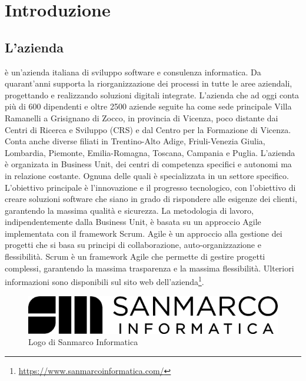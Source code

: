 \chapter{Introduzione}
\label{cap:introduzione}

%
%
%
%
%
%
%


\section{L'azienda}

\myCompany è un'azienda italiana di sviluppo software e consulenza informatica. Da quarant'anni supporta la riorganizzazione dei processi in tutte le aree aziendali, progettando e realizzando soluzioni digitali integrate. 
\newline
L'azienda che ad oggi conta più di 600 dipendenti e oltre 2500 aziende seguite ha come sede principale Villa Ramanelli a Grisignano di Zocco, in provincia di Vicenza, poco distante dai Centri di Ricerca e Sviluppo (CRS) e dal Centro per la Formazione di Vicenza. Conta anche diverse filiati in Trentino-Alto Adige, Friuli-Venezia Giulia, Lombardia, Piemonte, Emilia-Romagna, Toscana, Campania e Puglia. 
\newline
L'azienda è organizata in Business Unit, dei centri di competenza specifici e autonomi ma in relazione costante. Ognuna delle quali è specializzata in un settore specifico. 
\newline
L'obiettivo principale è l'innovazione e il progresso tecnologico, con l'obiettivo di creare soluzioni software che siano in grado di rispondere alle esigenze dei clienti, garantendo la massima qualità e sicurezza.
\newline
La metodologia di lavoro, indipendentemente dalla Business Unit, è basata su un approccio Agile implementata con il framework Scrum. Agile è un approccio alla gestione dei progetti che si basa su principi di collaborazione, auto-organizzazione e flessibilità. Scrum è un framework Agile che permette di gestire progetti complessi, garantendo la massima trasparenza e la massima flessibilità.
\newline
Ulteriori informazioni sono disponibili sul sito web dell'azienda\footnote{\url{https://www.sanmarcoinformatica.com/}}.
\begin{figure}[h!]
    \centering
    \includegraphics[width=0.5\columnwidth]{img/logo_sanmarco_informatica.png}
    \caption{Logo di Sanmarco Informatica}
    \label{fig:entanglement}
\end{figure}
